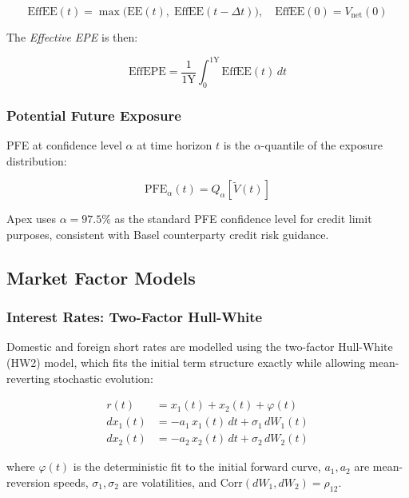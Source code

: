 \documentclass[11pt,a4paper]{article}
\begin{document}
\begin{equation}
  \text{EffEE}(t) = \max\!\bigl(\text{EE}(t),\; \text{EffEE}(t - \Delta t)\bigr),
  \quad \text{EffEE}(0) = V_{\text{net}}(0)
  \label{eq:eff_ee}
\end{equation}

The \emph{Effective EPE} is then:

\begin{equation}
  \text{EffEPE} = \frac{1}{1\text{Y}} \int_0^{1\text{Y}} \text{EffEE}(t)\, dt
  \label{eq:eff_epe}
\end{equation}

\subsubsection{Potential Future Exposure}

PFE at confidence level $\alpha$ at time horizon $t$ is the $\alpha$-quantile
of the exposure distribution:

\begin{equation}
  \text{PFE}_\alpha(t) = Q_\alpha\!\left[\tilde{V}(t)\right]
  \label{eq:pfe}
\end{equation}

Apex uses $\alpha = 97.5\%$ as the standard PFE confidence level for credit
limit purposes, consistent with Basel counterparty credit risk guidance.

\subsection{Market Factor Models}

\subsubsection{Interest Rates: Two-Factor Hull-White}

Domestic and foreign short rates are modelled using the two-factor Hull-White
(HW2) model, which fits the initial term structure exactly while allowing
mean-reverting stochastic evolution:

\begin{align}
  r(t) &= x_1(t) + x_2(t) + \varphi(t) \label{eq:hw2_r}\\
  dx_1(t) &= -a_1\, x_1(t)\, dt + \sigma_1\, dW_1(t) \label{eq:hw2_x1}\\
  dx_2(t) &= -a_2\, x_2(t)\, dt + \sigma_2\, dW_2(t) \label{eq:hw2_x2}
\end{align}

where $\varphi(t)$ is the deterministic fit to the initial forward curve,
$a_1, a_2$ are mean-reversion speeds, $\sigma_1, \sigma_2$ are volatilities,
and $\text{Corr}(dW_1, dW_2) = \rho_{12}$.
\end{document}
